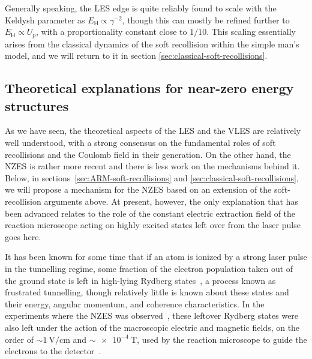 Generally speaking, the LES edge is quite reliably found to scale with the Keldysh parameter as $E_\mathsf{H}\propto\gamma^{-2}$, though this can mostly be refined further to $E_\mathsf{H}\propto U_p$, with a proportionality constant close to $1/10$. This scaling essentially arises from the classical dynamics of the soft recollision within the simple man's model, and we will return to it in section \ref{sec:classical-soft-recollisions}.











\subsection{Theoretical explanations for near-zero energy structures}
\label{sec:NZES-theory}

As we have seen, the theoretical aspects of the LES and the VLES are relatively well understood, with a strong consensus on the fundamental roles of soft recollisions and the Coulomb field in their generation. On the other hand, the NZES is rather more recent and there is less work on the mechanisms behind it. Below, in sections~\ref{sec:ARM-soft-recollisions} and \ref{sec:classical-soft-recollisions}, we will propose a mechanism for the NZES based on an extension of the soft-recollision arguments above. At present, however, the only explanation that has been advanced relates to the role of the constant electric extraction field of the reaction microscope acting on highly excited states left over from the laser pulse~\cite{ZES_paper, Rost_latest} goes here.

It has been known for some time that if an atom is ionized by a strong laser pulse in the tunnelling regime, some fraction of the electron population taken out of the ground state is left in high-lying Rydberg states~\cite{ nubbemeyer_rydberg-creation_2008, landsman_Rydberg-creation_2015, larimian_rydberg-detection_conference_2015}, a process known as frustrated tunnelling, though relatively little is known about these states and their energy, angular momentum, and coherence characteristics. In the experiments where the NZES was observed~\cite{dura_ionization_2013, ZES_paper}, these leftover Rydberg states were also left under the action of the macroscopic electric and magnetic fields, on the order of ${\sim}\SI{1}{\volt/\centi\meter}$ and ${\sim}\SI{e-4}{\tesla}$, used by the reaction microscope to guide the electrons to the detector~\cite{moshammer_ReMi_2003}.




